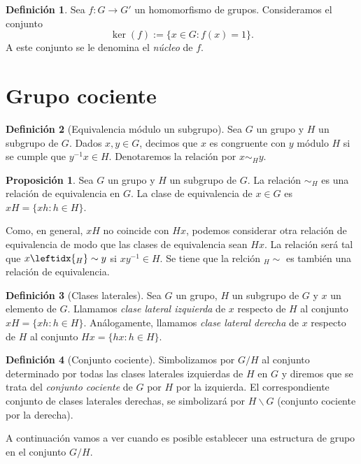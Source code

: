 \documentclass[12pt]{book}
\theoremstyle{definition}
\newtheorem{defi}{Definición}[section]
\newtheorem{prop}{Proposición}[section]
\begin{document}
\begin{defi}
Sea $f:G\rightarrow G'$ un homomorfismo de grupos. Consideramos el conjunto
$$\ker(f):=\{x\in G : f(x)=1\}.$$
A este conjunto se le denomina el \textit{núcleo} de $f$.
\end{defi}

\section{Grupo cociente}

\begin{defi}[Equivalencia módulo un subgrupo]
Sea $G$ un grupo y $H$ un subgrupo de $G$. Dados $x,y\in G$, decimos que $x$ es congruente con $y$ módulo $H$ si se cumple que $y^{-1}x\in H$. Denotaremos la relación por $x\sim_H y$.
\end{defi}



\begin{prop}
Sea $G$ un grupo y $H$ un subgrupo de $G$. La relación $\sim_H$ es una relación de equivalencia en $G$. La clase de equivalencia de $x\in G$ es $xH=\{xh:h\in H\}$.
\end{prop}

Como, en general, $xH$ no coincide con $Hx$, podemos considerar otra relación de equivalencia de modo que las clases de equivalencia sean $Hx$. La relación será tal que $x\leftidx{_H}\sim y$ si $xy^{-1}\in H$. Se tiene que la relción $_H\sim$ es también una relación de equivalencia.

\begin{defi}[Clases laterales]
Sea $G$ un grupo, $H$ un subgrupo de $G$ y $x$ un elemento de $G$. Llamamos \textit{clase lateral izquierda} de $x$ respecto de $H$ al conjunto $xH=\{xh:h\in H\}$. Análogamente, llamamos \textit{clase lateral derecha} de $x$ respecto de $H$ al conjunto $Hx=\{hx:h\in H\}$.
\end{defi}

\begin{defi}[Conjunto cociente]
Simbolizamos por $G/H$ al conjunto determinado por todas las clases laterales izquierdas de $H$ en $G$ y diremos que se trata del \textit{conjunto cociente} de $G$ por $H$ por la izquierda. El correspondiente conjunto de clases laterales derechas, se simbolizará por $H\backslash G$ (conjunto cociente por la derecha).
\end{defi}

A continuación vamos a ver cuando es posible establecer una estructura de grupo en el conjunto $G/H$.
\end{document}
